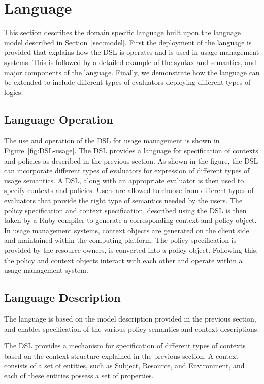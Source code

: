 \section{Language}\label{sec:language}
This section describes the domain specific language built upon the language model described in Section~\ref{sec:model}. First the deployment of the language is provided that explains how the DSL is operates and is used in usage management systems. This is followed by a detailed example of the syntax and semantics, and major components of the language. Finally, we demonstrate how the language can be extended to include different types of evaluators deploying different types of logics. 

\subsection{Language Operation}
The use and operation of the DSL for usage management is shown in Figure~\ref{fig:DSL-usage}. The DSL provides a language for specification of contexts and policies as described in the previous section. As shown in the figure, the DSL can incorporate different types of evaluators for expression of different types of usage semantics. A DSL, along with an appropriate evaluator is then used to specify contexts and policies. Users are allowed to choose from different types of evaluators that provide the right type of semantics needed by the users. The policy specification and context specification, described using the DSL is then taken by a Ruby compiler to generate a corresponding context and policy object. In usage management systems, context objects are generated on the client side and maintained within the computing platform. The policy specification is provided by the resource owners, is converted into a policy object. Following this, the policy and context objects interact with each other and operate within a usage management system.  

\subsection{Language Description}
The language is based on the model description provided in the previous section, and enables specification of the various policy semantics and context descriptions. 

The DSL provides a mechanism for specification of different types of contexts based on the context structure explained in the previous section. A context consists of a set of entities, such as Subject, Resource, and Environment, and each of these entities possess a set of properties. 


